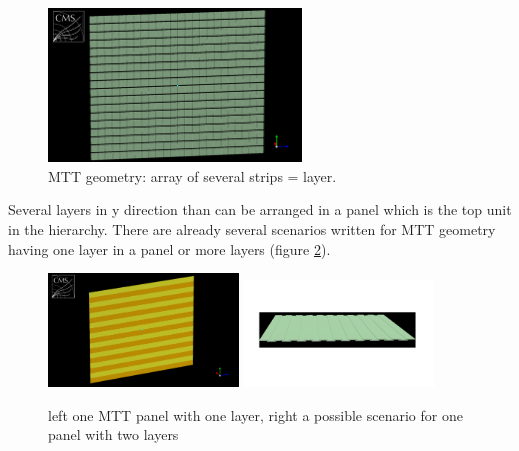 		\begin{figure}[htbp]
			\centering
			\includegraphics[width=0.6\textwidth]{Figures/erdogan/layer.png}
			\caption{MTT geometry: array of several strips = layer.}
			\label{fig:layer}
		\end{figure}
		Several layers in y direction than can be arranged in a panel which is the top unit in the hierarchy.
		There are already several scenarios written for MTT geometry having one layer in a panel or more layers (figure \ref{fig:panel}).
		\begin{figure}[htbp]
			\centering
			\includegraphics[width=0.45\textwidth]{Figures/erdogan/panel1.png}
			\includegraphics[width=0.45\textwidth]{Figures/erdogan/panel2.png}
			\caption{left one MTT panel with one layer, right a possible scenario for one panel with two layers}
			\label{fig:panel}
		\end{figure}
